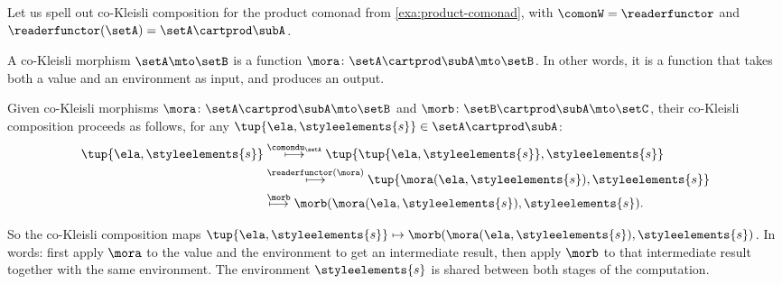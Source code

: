\begin{example}
\label{exa:cokleisli-product}
Let us spell out co-Kleisli composition for the product comonad from \cref{exa:product-comonad}, with $\comonW = \readerfunctor$ and $\readerfunctor(\setA) = \setA \cartprod \subA$.

A co-Kleisli morphism $\setA \mto \setB$ is a function $\mora \colon \setA \cartprod \subA \mto \setB$. In other words, it is a function that takes both a value and an environment as input, and produces an output.

Given co-Kleisli morphisms $\mora \colon \setA \cartprod \subA \mto \setB$ and $\morb \colon \setB \cartprod \subA \mto \setC$, their co-Kleisli composition proceeds as follows, for any $\tup{\ela, \styleelements{s}} \in \setA \cartprod \subA$:
\begin{equation*}
\begin{split}
\tup{\ela, \styleelements{s}} & \overset{\comondu_\setA}{\longmapsto} \tup{\tup{\ela, \styleelements{s}}, \styleelements{s}} \\
& \overset{\readerfunctor(\mora)}{\longmapsto} \tup{\mora(\ela, \styleelements{s}), \styleelements{s}} \\
& \overset{\morb}{\longmapsto} \morb(\mora(\ela, \styleelements{s}), \styleelements{s}).
\end{split}
\end{equation*}

So the co-Kleisli composition maps $\tup{\ela, \styleelements{s}} \mapsto \morb(\mora(\ela, \styleelements{s}), \styleelements{s})$. In words: first apply $\mora$ to the value and the environment to get an intermediate result, then apply $\morb$ to that intermediate result together with the same environment. The environment $\styleelements{s}$ is shared between both stages of the computation.
\end{example}


